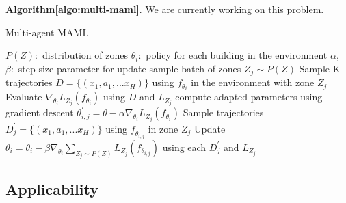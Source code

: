 \documentclass{article}
\begin{document}
\textbf{Algorithm\ref{algo:multi-maml}}. We are currently working on this problem. 

\begin{algorithm}
    \caption{Multi-agent MAML}
    \label{algo:multi-maml}
  \begin{algorithmic}[1]
    \REQUIRE $P(Z):$ distribution of zones
    \REQUIRE $\theta_{i}:$ policy for each building in the environment
    \REQUIRE $\alpha$, $\beta:$ step size parameter for update
        \State sample batch of zones $Z_{j} \sim P(Z)$
                \State Sample K trajectories $D = \{(x_{1}, a_{1}, ...x_{H})\}$ using $f_{\theta_{i}}$ in the environment with zone $Z_{j}$
                \State Evaluate $\nabla_{\theta_{i}}L_{Z_{j}}(f_{\theta_{i}})$ using $D$ and $L_{Z_{j}}$
                \State compute adapted parameters using gradient descent $\theta^{'}_{i,j} = \theta - \alpha \nabla_{\theta_{i}}L_{Z_{j}}(f_{\theta_{i}})$
                \State Sample trajectories $D^{'}_{j} = \{(x_{1}, a_{1}, ...x_{H})\}$ using $f_{\theta^{'}_{i,j}}$ in zone $Z_{j}$
            \ENDFOR
            \State Update $\theta_{i} = \theta_{i} -\beta \nabla_{\theta_{i}}\sum_{Z_{j} \sim P(Z)} L_{Z_{j}}(f_{\theta_{i,j}})$ using each $D^{'}_{j}$ and $L_{Z_{j}}$
        \ENDFOR
    \ENDWHILE
  \end{algorithmic}
\end{algorithm}

\subsection{Applicability}
\end{document}
